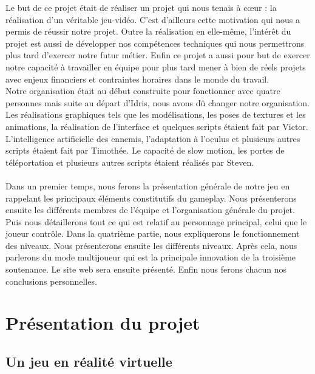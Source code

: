 \documentclass[12pt]{article}
\begin{document}
Le but de ce projet était de réaliser un projet qui nous tenais à cœur : la réalisation d'un véritable jeu-vidéo. C'est d'ailleurs cette motivation qui nous a permis de réussir notre projet. Outre la réalisation en elle-même, l'intérêt du projet est aussi de développer nos compétences techniques qui nous permettrons plus tard d'exercer notre futur métier. Enfin ce projet a aussi pour but de exercer notre capacité à travailler en équipe pour plus tard mener à bien de réels projets avec enjeux financiers et contraintes horaires dans le monde du travail.\\
Notre organisation était au début construite pour fonctionner avec quatre personnes mais suite au départ d'Idris, nous avons dû changer notre organisation. Les réalisations graphiques tels que les modélisations, les poses de textures et les animations, la réalisation de l'interface et quelques scripts étaient fait par Victor. L'intelligence artificielle des ennemis, l'adaptation à l'oculus et plusieurs autres scripts étaient fait par Timothée. Le capacité de slow motion, les portes de téléportation et plusieurs autres scripts étaient réalisés par Steven.\\\\

Dans un premier temps, nous ferons la présentation générale de notre jeu en rappelant les principaux éléments constitutifs du gameplay. Nous présenterons ensuite les différents membres de l'équipe et l'organisation générale du projet. Puis nous détaillerons tout ce qui est relatif au personnage principal, celui que le joueur contrôle. Dans la quatrième partie, nous expliquerons le fonctionnement des niveaux. Nous présenterons ensuite les différents niveaux. Après cela, nous parlerons du mode multijoueur qui est la principale innovation de la troisième soutenance. Le site web sera ensuite présenté. Enfin nous ferons chacun nos conclusions personnelles.


\newpage

\renewcommand{\contentsname}{Sommaire}
\tableofcontents

\newpage

\section{Présentation du projet}

\subsection{Un jeu en réalité virtuelle}
\end{document}
